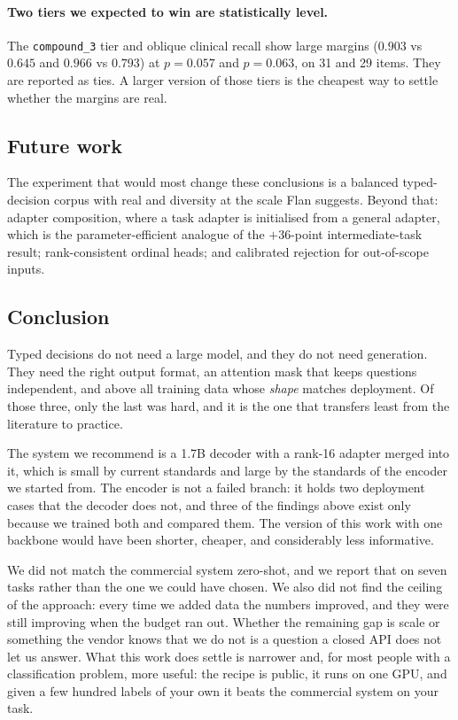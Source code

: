 \paragraph{Two tiers we expected to win are statistically level.} The
\texttt{compound\_3} tier and oblique clinical recall show large margins
($0.903$ vs $0.645$ and $0.966$ vs $0.793$) at $p = 0.057$ and $p =
0.063$, on 31 and 29 items. They are reported as ties. A larger version
of those tiers is the cheapest way to settle whether the margins are
real.

\subsection{Future work}

The experiment that would most change these conclusions is a balanced
typed-decision corpus with real \score{} and \noul{} diversity at the
scale Flan suggests. Beyond that: adapter composition, where a task
adapter is initialised from a general adapter, which is the
parameter-efficient analogue of the $+36$-point intermediate-task result;
rank-consistent ordinal heads; and calibrated rejection for out-of-scope
inputs.

\subsection{Conclusion}

Typed decisions do not need a large model, and they do not need
generation. They need the right output format, an attention mask that
keeps questions independent, and above all training data
whose \emph{shape} matches deployment. Of those three, only the last was
hard, and it is the one that transfers least from the literature to
practice.

The system we recommend is a 1.7B decoder with a rank-16 adapter merged
into it, which is small by current standards and large by the standards
of the encoder we started from. The encoder is not a failed branch: it
holds two deployment cases that the decoder does not, and three of the
findings above exist only because we trained both and compared them. The
version of this work with one backbone would have been shorter, cheaper,
and considerably less informative.

We did not match the commercial system zero-shot, and we report that on
seven tasks rather than the one we could have chosen. We also did not
find the ceiling of the approach: every time we added data the numbers
improved, and they were still improving when the budget ran out. Whether
the remaining gap is scale or something the vendor knows that we do not
is a question a closed API does not let us answer. What this work does
settle is narrower and, for most people with a classification problem,
more useful: the recipe is public, it runs on one GPU, and given a few
hundred labels of your own it beats the commercial system on your task.
